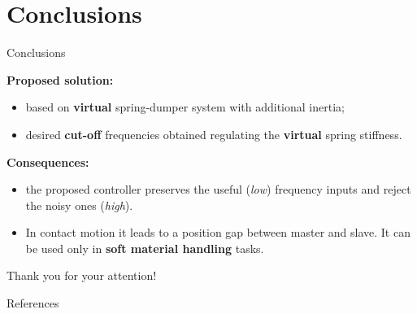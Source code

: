 \documentclass[10pt]{beamer}
\begin{document}
\section{Conclusions}

\begin{frame}{Conclusions}

  \textbf{Proposed solution:} 
  \begin{itemize}
  \item based on \textbf{virtual} spring-dumper system with additional inertia;
  \item desired \textbf{cut-off} frequencies obtained regulating the \textbf{virtual} spring stiffness.
  \end{itemize}

  \textbf{Consequences:} 
  \begin{itemize}
  \item the proposed controller preserves the useful (\textsl{low}) frequency inputs and reject the noisy ones (\textsl{high}). 
  \item In contact motion it leads to a position gap between master and slave. It can be used only in \textbf{soft material handling} tasks.
  \end{itemize}
\end{frame}

{
\begin{frame}[standout]
Thank you for your attention!
\end{frame}
}


\begin{frame}{References}
	\nocite{trakarnchaiyo2017vibration}
	\nocite{hokayem2006bilateral}
%	
	
\end{frame}

\appendix
\end{document}

